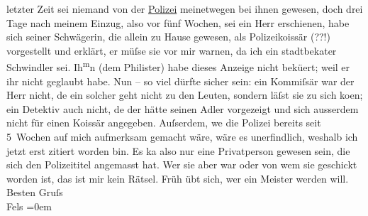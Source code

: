 \begin{ledgroupsized}[t]{13cm}
                    letzter Zeit sei niemand von der \uline{Polizei}
                    meinetwegen bei ihnen gewesen, doch drei Tage nach meinem Einzug, also vor fünf
                    Wochen, sei ein Herr erschienen, habe sich seiner Schwägerin, die allein zu
                    Hause gewesen, als Polizeiko{\geminationm}issär (??!)
                    vorgestellt und erklärt, er müſse sie vor mir warnen, da ich ein stadtbeka{\geminationn}ter Schwindler sei. Ih\substVorne{}\textsuperscript{m}\substDazwischen{}n\substHinten{} (dem Philister)
                    habe dieses Anzeige nicht bekü{\geminationm}ert; weil er ihr
                    nicht geglaubt habe.\pend
           \pstart
           Nun – so viel dürfte sicher sein: ein Kommiſsär war der Herr nicht,
                        de{\geminationn} ein solcher geht nicht zu den Leuten,
                    sondern läſst sie zu sich ko{\geminationm}en; ein Detektiv auch
                    nicht, de{\geminationn} der {\pb}hätte seinen Adler vorgezeigt und sich ausserdem nicht für einen Ko{\geminationm}issär angegeben. Auſserdem, we{\geminationn} die Polizei bereits seit 5 Wochen auf mich
                    aufmerksam gemacht wäre, wäre es unerfindlich, weshalb ich jetzt erst zitiert
                    worden bin. Es ka{\geminationn} also nur eine Privatperson
                    gewesen sein, die sich den Polizeititel angemasst hat. Wer sie aber war oder von
                    wem sie geschickt worden ist, das ist mir kein Rätsel. Früh übt sich, wer ein
                    Meister werden will.\pend
           \pstart
           Besten Gruſs{\\[\baselineskip]}\spacefill\mbox{Fels}\pend
           \leftskip=0em{}
         
         \endnumbering{}\end{ledgroupsized}  \newcommand{\dateiname}{L00401}\newcommand{\titel}{Friedrich M. Fels an Arthur Schnitzler, [12. 11. 1894]}\newcommand{\editorInnen}{Martin Anton Müller und Gerd-Hermann Susen}
      